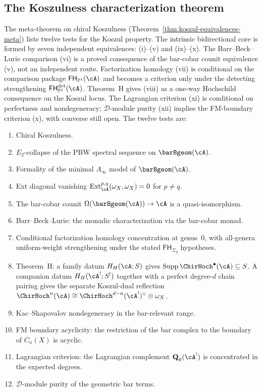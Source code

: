 \subsection{The Koszulness characterization theorem}
\label{subsec:thqg-intro-guide-koszulness}

The meta-theorem on chiral Koszulness
(Theorem~\ref{thm:koszul-equivalences-meta}) lists twelve
tests for the Koszul property. The intrinsic bidirectional core is
formed by seven independent equivalences:
\textup{(i)--(v)} and \textup{(ix)--(x)}. The
Barr--Beck--Lurie comparison \textup{(vi)} is a proved consequence of
the bar-cobar counit equivalence \textup{(v)}, not an independent
route. Factorization homology \textup{(vii)} is conditional on the
comparison package $\mathsf{FH}_{\mathbb{P}^1}(\cA)$ and becomes a
criterion only under the detecting strengthening
$\mathsf{FH}^{\mathrm{det}}_{\mathbb{P}^1}(\cA)$. Theorem~H gives
\textup{(viii)} as a one-way Hochschild consequence on the Koszul
locus. The Lagrangian criterion \textup{(xi)} is conditional on
perfectness and nondegeneracy; $\mathcal D$-module purity
\textup{(xii)} implies the FM-boundary criterion \textup{(x)}, with
converse still open. The twelve tests are:
\begin{enumerate}[label=\textup{(\roman*)}]
\item Chiral Koszulness.
\item $E_2$-collapse of the PBW spectral sequence on
 $\barBgeom(\cA)$.
\item Formality of the minimal $A_\infty$ model of
 $\barBgeom(\cA)$.
\item Ext diagonal vanishing
 $\operatorname{Ext}^{p,q}_\cA(\omega_X,\omega_X)=0$ for $p\ne q$.
\item The bar-cobar counit
 $\Omega(\barBgeom(\cA))\to\cA$ is a quasi-isomorphism.
\item Barr--Beck--Lurie: the monadic characterization via the
 bar-cobar monad.
\item Conditional factorization homology concentration at genus~$0$,
 with all-genera uniform-weight strengthening under the stated
 $\mathsf{FH}_{\Sigma_g}$ hypotheses.
\item Theorem~H: a family datum $H_H(\cA;S)$ gives
 $\operatorname{Supp}\ChirHoch^\bullet(\cA)\subseteq S$.
 A companion datum $H_H(\cA^!;S^!)$ together with a perfect
 degree-$d$ chain pairing gives the separate Koszul-dual reflection
 $\ChirHoch^n(\cA)\cong
 \ChirHoch^{d-n}(\cA^!)^\vee\otimes\omega_X$.
\item Kac--Shapovalov nondegeneracy in the bar-relevant range.
\item FM boundary acyclicity: the restriction of the bar complex to
 the boundary of $\overline{C}_n(X)$ is acyclic.
\item Lagrangian criterion: the Lagrangian complement
 $\mathbf{Q}_g(\cA^!)$ is concentrated in the expected degrees.
\item $\mathcal D$-module purity of the geometric bar terms.
\end{enumerate}
